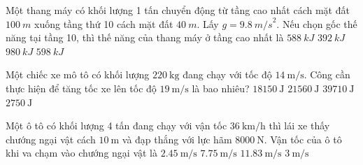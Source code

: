 \begin{ex}
	Một thang máy có khối lượng 1 tấn chuyển động từ tầng cao nhất cách mặt đất $\SI{100}{m}$ xuống tầng thứ 10 cách mặt đất $\SI{40}{m}$. Lấy $g = \SI{9.8}{m/s}^2$. Nếu chọn gốc thế năng tại tầng 10, thì thế năng của thang máy ở tầng cao nhất là
	\choice
	{\True $\SI{588}{kJ}$}
	{$\SI{392}{kJ}$}
	{$\SI{980}{kJ}$}
	{$\SI{598}{kJ}$}
\end{ex}
\begin{ex}
	Một chiếc xe mô tô có khối lượng $\SI{220}{\kilogram}$ đang chạy với tốc độ $\SI{14}{\meter/\second}$. Công cần thực hiện để tăng tốc xe lên tốc độ $\SI{19}{\meter/\second}$ là bao nhiêu?
	\choice
	{\True $\SI{18150}{\joule}$}
	{$\SI{21560}{\joule}$}
	{$\SI{39710}{\joule}$}
	{$\SI{2750}{\joule}$}
	\loigiai{}
\end{ex}
\begin{ex}
	Một ô tô có khối lượng 4 tấn đang chạy với vận tốc $\SI{36}{\kilo\meter/\hour}$ thì lái xe thấy chướng ngại vật cách $\SI{10}{\meter}$ và đạp thắng với lực hãm $\SI{8000}{\newton}$. Vận tốc của ô tô khi va chạm vào chướng ngại vật là
	\choice
	{$\SI{2.45}{\meter/\second}$}
	{\True $\SI{7.75}{\meter/\second}$}
	{$\SI{11.83}{\meter/\second}$}
	{$\SI{3}{\meter/\second}$}
	\loigiai{}
\end{ex}
